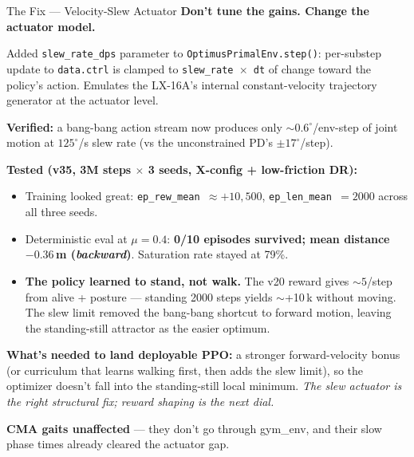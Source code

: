 \documentclass[aspectratio=169]{beamer}
\begin{document}
\begin{frame}{The Fix --- Velocity-Slew Actuator}
\textbf{Don't tune the gains. Change the actuator model.}

\vspace{0.5em}
Added \texttt{slew\_rate\_dps} parameter to \texttt{OptimusPrimalEnv.step()}: per-substep update to \texttt{data.ctrl} is clamped to \texttt{slew\_rate $\times$ dt} of change toward the policy's action. Emulates the LX-16A's internal constant-velocity trajectory generator at the actuator level.

\vspace{0.5em}
\textbf{Verified:} a bang-bang action stream now produces only $\sim 0.6^\circ$/env-step of joint motion at $125^\circ$/s slew rate (vs the unconstrained PD's $\pm 17^\circ$/step).

\vspace{0.5em}
\textbf{Tested (v35, 3M steps $\times$ 3 seeds, X-config + low-friction DR):}
\begin{itemize}
    \item Training looked great: \texttt{ep\_rew\_mean $\approx +10{,}500$}, \texttt{ep\_len\_mean $= 2000$} across all three seeds.
    \item Deterministic eval at $\mu{=}0.4$: \textbf{0/10 episodes survived; mean distance $-0.36$\,m (\emph{backward})}. Saturation rate stayed at 79\%.
    \item \textbf{The policy learned to stand, not walk.} The v20 reward gives $\sim 5$/step from alive + posture --- standing 2000 steps yields $\sim$+10\,k without moving. The slew limit removed the bang-bang shortcut to forward motion, leaving the standing-still attractor as the easier optimum.
\end{itemize}

\vspace{0.3em}
\textbf{What's needed to land deployable PPO:} a stronger forward-velocity bonus (or curriculum that learns walking first, then adds the slew limit), so the optimizer doesn't fall into the standing-still local minimum. \emph{The slew actuator is the right structural fix; reward shaping is the next dial.}

\vspace{0.3em}
\textbf{CMA gaits unaffected} --- they don't go through gym\_env, and their slow phase times already cleared the actuator gap.
\end{frame}
\end{document}
